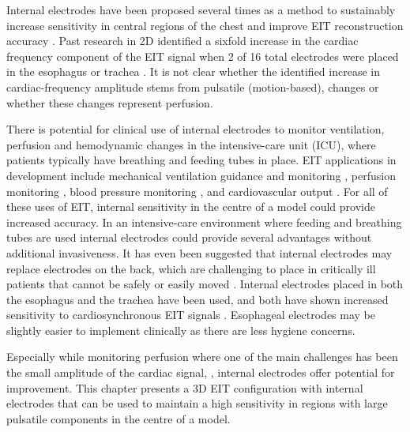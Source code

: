 Internal electrodes have been proposed several times as a method to 
sustainably increase sensitivity in central regions of the 
chest and improve EIT reconstruction 
accuracy \parencite{pilkington_utilization_1989,schuessler_utility_1995,nasehi_tehrani_evaluation_2012, 
czaplik_application_2014,nguyen_electrical_2020}.
Past research in 2D identified a sixfold increase in the cardiac frequency 
component of the EIT signal 
when 2 of 16 total electrodes were placed in the 
esophagus or trachea \parencite{czaplik_application_2014}. It is not clear whether 
the identified increase in cardiac-frequency amplitude stems from pulsatile 
(motion-based), changes or whether these changes represent 
perfusion.

There is potential for clinical use of internal electrodes 
to monitor ventilation, perfusion and 
hemodynamic changes in the 
intensive-care unit (ICU), where patients typically have
breathing and feeding tubes in place.
EIT applications in development include mechanical ventilation 
guidance and monitoring \parencite{frerichs_chest_2017}, perfusion 
monitoring \parencite{frerichs_regional_2002,smit_electrical_2003}, 
blood pressure monitoring \parencite{sola_non-invasive_2011,proenca_noninvasive_2017}, 
and cardiovascular output \parencite{braun_accuracy_2018}. 
For all of these uses of EIT, internal sensitivity in the centre of 
a model could provide increased accuracy. 
In an 
intensive-care environment where feeding and breathing tubes 
are used internal electrodes could provide 
several advantages without additional invasiveness. 
It has even been suggested that internal electrodes may replace 
electrodes on the back, which are challenging to place in critically 
ill patients that cannot be safely or easily 
moved \parencite{czaplik_application_2014}.
Internal electrodes placed in both the esophagus and the trachea
have been used, and both have shown increased sensitivity to cardiosynchronous
EIT signals \parencite{czaplik_application_2014}. 
Esophageal electrodes may be slightly easier to implement 
clinically as there are less hygiene concerns.

Especially while monitoring perfusion where one of the main challenges
has been the small amplitude of the cardiac signal,
\parencite{nguyen_review_2012}, internal electrodes offer
potential for improvement.
This chapter presents a 3D EIT configuration with internal electrodes
that can be used to maintain a high sensitivity in regions with 
large pulsatile components in the centre of a model.

